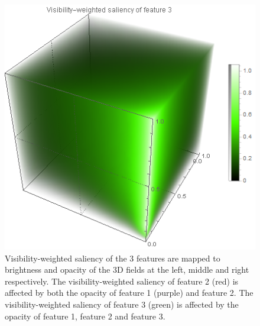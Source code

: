 \begin{figure}
\begin{minipage}{.3\textwidth}
	\end{minipage}
	\begin{minipage}{.3\textwidth}
		\includegraphics[width=1\linewidth]{images/nucleon_strong_red_densityplot3}	
	\end{minipage}
	\caption{Visibility-weighted saliency of the 3 features are mapped to brightness and opacity of the 3D fields at the left, middle and right respectively. The visibility-weighted saliency of feature 2 (red) is affected by both the opacity of feature 1 (purple) and feature 2. The visibility-weighted saliency of feature 3 (green) is affected by the opacity of feature 1, feature 2 and feature 3.}
	\label{fig:nucleon_densityplot}
\end{figure}

